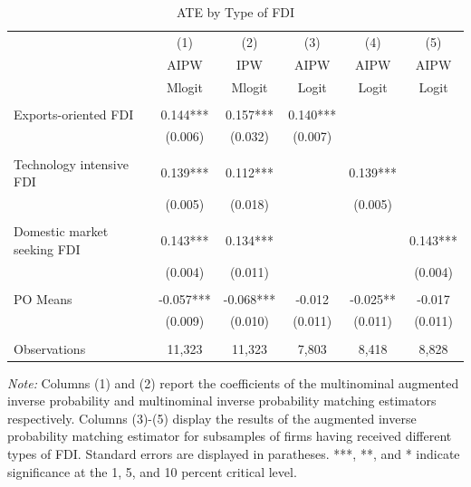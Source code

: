 \documentclass[a4paper,11pt]{scrartcl}
\begin{document}
\begin{table}[h!]
	\centering
	\caption{ATE by Type of FDI}
	\label{tab:bytype}
\begin{threeparttable}

\begin{tabular}{lccccc} 
		\hline
		\hline
 	& (1) & (2) & (3) & (4) & (5) \\
	& AIPW & IPW  & AIPW  & AIPW & AIPW \\ 
	& Mlogit & Mlogit &Logit &Logit &Logit\\
		\hline
 			&  &  &  &  &   \\
Exports-oriented FDI 	& 0.144*** &   0.157*** & 0.140*** &  &  \\
 						& (0.006) &   (0.032) & (0.007) &  &\\ \\[-1.8ex]
Technology intensive FDI & 0.139***   & 0.112*** &  & 0.139*** &   \\
 						 & (0.005)  & (0.018) &  &  (0.005)&  \\ \\[-1.8ex]
Domestic market seeking FDI & 0.143*** &   0.134*** &  &  &0.143*** \\
 							& (0.004)   & (0.011) &  &  & (0.004)  \\ \\[-1.8ex]
PO Means 		&   -0.057*** &   -0.068*** &-0.012  &-0.025**  & -0.017    \\
 				&   (0.009) &   (0.010) &  (0.011)&(0.011)  & (0.011) \\ \\[-0.2em]
Observations 	& 11,323  & 11,323 &  7,803  & 8,418 & 8,828  \\ 
		\hline
		\hline
\end{tabular}

\begin{tablenotes} [flushleft]
\footnotesize
\item \textit{Note:} Columns (1) and (2) report the coefficients of the multinominal augmented inverse probability and multinominal inverse probability matching estimators respectively. Columns (3)-(5) display the results of the augmented inverse probability matching estimator for subsamples of firms having received different types of FDI. Standard errors are displayed in paratheses. ***, **, and * indicate significance at the 1, 5, and 10 percent critical level. 
\end{tablenotes}

\end{threeparttable}
\end{table}
\FloatBarrier
\end{document}
